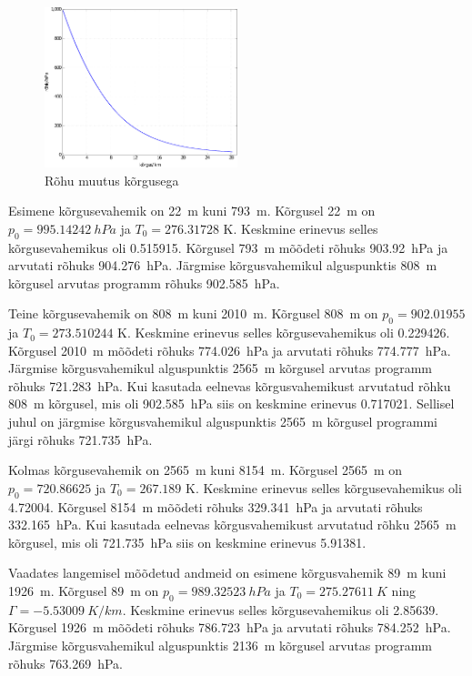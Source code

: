\documentclass{trkut}%
\begin{document}
\begin{figure}[h]
	\includegraphics[width=0.5\textwidth]{PicGra/prekõrg.pdf}
	\caption{Rõhu muutus kõrgusega}
	\label{prekõrg}%
\end{figure}

Esimene kõrgusevahemik on \SI{22}{m} kuni \SI{793}{m}. Kõrgusel \SI{22}{m} on $p_0=\SI{995.14242}{hPa}$ ja $T_0 = 276.31728$ K. Keskmine erinevus selles kõrgusevahemikus oli \SI{0.515915}{\permil}. Kõrgusel \SI{793}{m} mõõdeti rõhuks \SI{903.92}{hPa} ja arvutati rõhuks \SI{904.276}{hPa}. Järgmise kõrgusvahemikul alguspunktis \SI{808}{m} kõrgusel arvutas programm rõhuks \SI{902.585}{hPa}.

Teine kõrgusevahemik on \SI{808}{m} kuni \SI{2010}{m}. Kõrgusel \SI{808}{m} on $p_0 = 902.01955$ ja $T_0 = 273.510244$ K. Keskmine erinevus selles kõrgusevahemikus oli \SI{0.229426}{\permil}. Kõrgusel \SI{2010}{m} mõõdeti rõhuks \SI{774.026}{hPa} ja arvutati rõhuks \SI{774.777}{hPa}. Järgmise kõrgusvahemikul alguspunktis \SI{2565}{m} kõrgusel arvutas programm rõhuks \SI{721.283}{hPa}. Kui kasutada eelnevas kõrgusvahemikust arvutatud rõhku \SI{808}{m} kõrgusel, mis oli \SI{902.585}{hPa} siis on keskmine erinevus \SI{0.717021}{\permil}. Sellisel juhul on järgmise kõrgusvahemikul alguspunktis \SI{2565}{m} kõrgusel programmi järgi rõhuks \SI{721.735}{hPa}.

Kolmas kõrgusevahemik on \SI{2565}{m} kuni \SI{8154}{m}. Kõrgusel \SI{2565}{m} on $p_0 = 720.86625$ ja $T_0 = 267.189$ K. Keskmine erinevus selles kõrgusevahemikus oli \SI{4.72004}{\permil}. Kõrgusel \SI{8154}{m} mõõdeti rõhuks \SI{329.341}{hPa} ja arvutati rõhuks \SI{332.165}{hPa}. Kui kasutada eelnevas kõrgusvahemikust arvutatud rõhku \SI{2565}{m} kõrgusel, mis oli \SI{721.735}{hPa} siis on keskmine erinevus \SI{5.91381}{\permil}.

Vaadates langemisel mõõdetud andmeid on esimene kõrgusvahemik \SI{89}{m} kuni \SI{1926}{m}. Kõrgusel \SI{89}{m} on $p_0=\SI{989.32523}{hPa}$ ja $T_0 = \SI{275.27611}{K}$ ning $\Gamma = \SI{-5.53009}{K/km}$. Keskmine erinevus selles kõrgusevahemikus oli \SI{2.85639}{\permil}. Kõrgusel \SI{1926}{m} mõõdeti rõhuks \SI{786.723}{hPa} ja arvutati rõhuks \SI{784.252}{hPa}. Järgmise kõrgusvahemikul alguspunktis \SI{2136}{m} kõrgusel arvutas programm rõhuks \SI{763.269}{hPa}.
\end{document}
